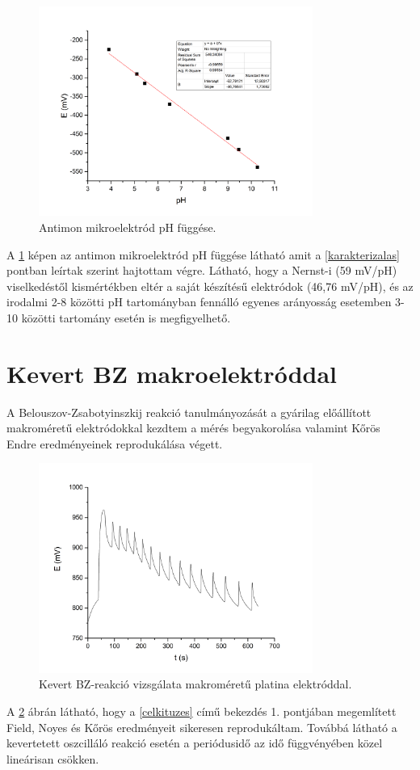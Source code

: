 \begin{figure}[h]
\centering
\includegraphics[width=0.8\textwidth]{img/antimon_ph.jpg}
\caption{Antimon mikroelektród pH függése.}
\label{fig:antimon_ph}
\end{figure}

A \ref{fig:antimon_ph} képen az antimon mikroelektród pH függése látható amit a \ref{karakterizalas} pontban leírtak szerint hajtottam végre. Látható, hogy a Nernst-i (59 mV/pH) viselkedéstől kismértékben eltér a saját készítésű elektródok (46,76 mV/pH), és az irodalmi 2-8 közötti pH tartományban \cite{pfreisich1960} fennálló egyenes arányosság esetemben 3-10 közötti tartomány esetén is megfigyelhető.
\section{Kevert BZ makroelektróddal}
A Belouszov-Zsabotyinszkij reakció tanulmányozását a gyárilag előállított makroméretű elektródokkal kezdtem a mérés begyakorolása valamint Kőrös Endre eredményeinek \cite{noyes1972oscillations} reprodukálása végett. 
\begin{figure}[h]
\centering
\includegraphics[width=0.8\textwidth]{img/makroelektrod.jpg}
\caption{Kevert BZ-reakció vizsgálata makroméretű platina elektróddal.}
\label{fig:makroelektrod}
\end{figure}
A \ref{fig:makroelektrod} ábrán látható, hogy a \ref{celkituzes} című bekezdés 1. pontjában megemlített Field, Noyes és Kőrös eredményeit \cite{noyes1972oscillations} sikeresen reprodukáltam. Továbbá látható a kevertetett oszcilláló reakció esetén a periódusidő az idő függvényében közel lineárisan csökken. 

